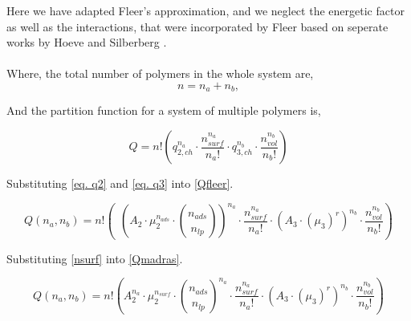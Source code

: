 \documentclass[10pt,letterpaper]{article}
\begin{document}
\noindent Here we have adapted Fleer's approximation, 
%
and we neglect the energetic factor as well as the interactions, that were incorporated by Fleer based on seperate works by Hoeve \cite{hoeve1970general}  and Silberberg \cite{silberberg1968adsorption}.\\\\

\noindent Where, the total number of polymers in the whole system are,
\begin{equation}
	n=n_a+n_b,
	\label{eq. n}
\end{equation}

\noindent And the partition function for a system of multiple polymers is,



\begin{equation}
	Q=
	n!
	\left(
		q_{2,ch}^{n_{a}}
		\cdot
		\frac{
			n_{surf}^{n_{a}}
		}{
			n_a!
		}
		\cdot
		q_{3,ch}^{n_{b}}
		\cdot
		\frac{
			n_{vol}^{n_{b}}
		}{
			n_b!
		}
	\right)
	\label{Qfleer}
\end{equation}

\noindent Substituting \ref{eq. q2} and \ref{eq. q3} into \ref{Qfleer}.

\begin{equation}
	Q(n_a,n_b)=
	n!
	\left(~~
		\left(
		A_2
		\cdot 
		\mu_{2}^{n_{ads}}
		\cdot 
		\binom{
			n_{ads}
		}{
			n_{lp}
		}
		\right)^{n_{a}} 
		\cdot
		\frac{
			n_{surf}^{n_{a}}
		}{
			n_a!
		}
		\cdot
		\left(
			A_3
			\cdot
			\left(
				\mu_{3}
			\right)^{r}
		\right)^{n_{b}}
		\cdot
		\frac{
			n_{vol}^{n_{b}}
		}{
			n_b!
		}
	\right)
	\label{Qmadras}
\end{equation}

\noindent Substituting \ref{nsurf} into \ref{Qmadras}.

\begin{equation}
	Q(n_a,n_b)=
	n!
	\left(
		A_2^{n_{a}}
		\cdot 
		\mu_{2}^{n_{surf}} 
		\cdot 
		\binom{
			n_{ads}
		}{
			n_{lp}
		}^{n_{a}}
		\cdot
		\frac{
			n_{surf}^{n_{a}}
		}{
			n_a!
		}
		\cdot
		\left(
		A_3
		\cdot
		(\mu_{3})^{r}
	\right)^{n_{b}}
	\cdot
	\frac{
		n_{vol}^{n_{b}}
	}{
		n_b!
	}
	\right)
	\label{Qwithnsurf}
\end{equation}
\end{document}
